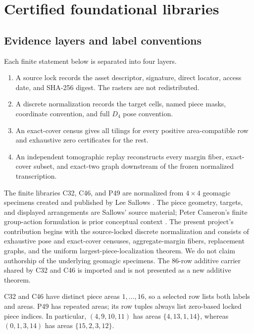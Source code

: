 \section{Certified foundational libraries}\label{sec:libraries}

\subsection{Evidence layers and label conventions}

Each finite statement below is separated into four layers.

\begin{enumerate}
  \item A source lock records the asset descriptor, signature, direct locator,
        access date, and SHA-256 digest.  The rasters are not redistributed.
  \item A discrete normalization records the target cells, named piece masks,
        coordinate convention, and full \(D_4\) pose convention.
  \item An exact-cover census gives all tilings for every positive
        area-compatible row and exhaustive zero certificates for the rest.
  \item An independent tomographic replay reconstructs every margin fiber,
        exact-cover subset, and exact-two graph downstream of the frozen
        normalized transcription.
\end{enumerate}

The finite libraries C32, C46, and P49 are normalized from \(4\times4\)
geomagic specimens created and published by Lee Sallows
\cite{Sallows2011,SallowsGallery}.  The piece geometry, targets, and displayed
arrangements are Sallows' source material; Peter Cameron's finite
group-action formulation is prior conceptual context \cite{Cameron2011}.
The present project's contribution begins with the source-locked discrete
normalization and consists of exhaustive pose and exact-cover censuses,
aggregate-margin fibers, replacement graphs, and the uniform
largest-piece-localization theorem.  We do not claim authorship of the
underlying geomagic specimens.  The 86-row additive carrier shared by C32
and C46 is imported and is not presented as a new additive theorem.

C32 and C46 have distinct piece areas \(1,\ldots,16\), so a selected row lists
both labels and areas.  P49 has repeated areas; its row tuples always list
zero-based locked piece indices.  In particular,
\((4,9,10,11)\) has areas \(\{4,13,1,14\}\), whereas
\((0,1,3,14)\) has areas \(\{15,2,3,12\}\).

